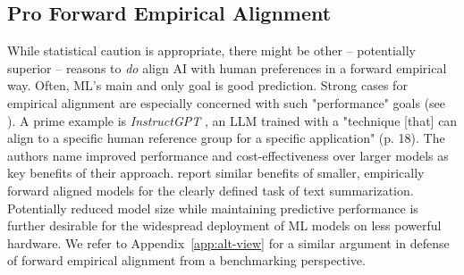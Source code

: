 \documentclass{article}
\theoremstyle{plain}
\theoremstyle{definition}
\theoremstyle{remark}
\begin{document}
\subsection{Pro Forward Empirical Alignment} 
While statistical caution is appropriate, there might be other -- potentially superior -- reasons to \textit{do} align AI with human preferences in a forward empirical way. Often, ML's main and only goal is good prediction. Strong cases for empirical alignment are especially concerned with such "performance" goals (see \citet{reward_learning_from_human_pref_borja}). A prime example is \textit{InstructGPT} \cite{ouyang2022instructgpt}, an LLM trained with a "technique [that] can align to a specific human reference group for a specific application" (p. 18). The authors name improved performance and cost-effectiveness over larger models as key benefits of their approach. \citet{stiennon2020learning} report similar benefits of smaller, empirically forward aligned models for the clearly defined task of text summarization. Potentially reduced model size while maintaining predictive performance is further desirable for the widespread deployment of ML models on less powerful hardware. We refer to Appendix~\ref{app:alt-view} for a similar argument in defense of forward empirical alignment from a benchmarking perspective.

\end{document}
